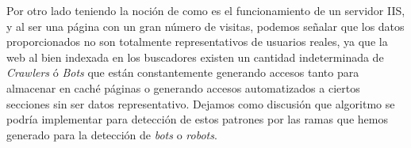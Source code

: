 \begin{enumerate}
	
	
	Por otro lado teniendo la noción de como es el funcionamiento de un servidor IIS, y al ser una página con un gran número de visitas, podemos señalar que los datos proporcionados no son totalmente representativos de usuarios reales, ya que la web al bien indexada en los buscadores existen un cantidad indeterminada de \emph{Crawlers} ó \emph{Bots} que están constantemente generando accesos tanto para almacenar en caché páginas o generando accesos automatizados a ciertos secciones sin ser datos representativo. Dejamos como discusión que algoritmo se podría implementar para detección de estos patrones por las ramas que hemos generado para la detección de \emph{bots} o \emph{robots}.
	
	
	
	
	 
	
\end{enumerate}








 






